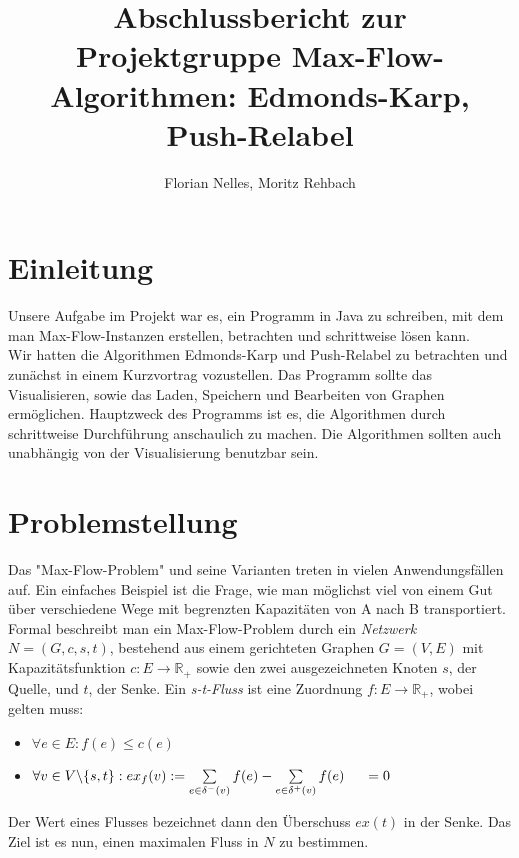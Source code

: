 \documentclass{llncs}
\begin{document}
\title{Abschlussbericht zur Projektgruppe Max-Flow-Algorithmen: Edmonds-Karp, Push-Relabel}

\author{Florian Nelles, Moritz Rehbach}

\maketitle
\vspace{1cm}
\section{Einleitung}
Unsere Aufgabe im Projekt war es, ein Programm in Java zu schreiben, mit dem man Max-Flow-Instanzen erstellen, betrachten und schrittweise lösen kann. \\
Wir hatten die Algorithmen Edmonds-Karp \cite{Roe1} und Push-Relabel \cite{KV} zu betrachten und zunächst in einem Kurzvortrag vozustellen. 
Das Programm sollte das Visualisieren, sowie das Laden, Speichern und Bearbeiten von Graphen ermöglichen. Hauptzweck des Programms ist es, die Algorithmen durch schrittweise Durchführung anschaulich zu machen. Die Algorithmen sollten auch unabhängig von der Visualisierung benutzbar sein.

\section{Problemstellung}\label{sec:Problemstellung}

Das "Max-Flow-Problem" und seine Varianten treten in vielen Anwendungsfällen auf. Ein einfaches Beispiel ist die Frage, wie man möglichst viel von einem Gut über verschiedene Wege mit begrenzten Kapazitäten von A nach B transportiert.\\
Formal beschreibt man ein Max-Flow-Problem durch ein \textit{Netzwerk} $N=(G,c,s,t)$, bestehend aus einem gerichteten Graphen $ G=(V,E) $ mit Kapazitätsfunktion $ c: E \rightarrow  \mathbb{R_+} $ sowie den zwei ausgezeichneten Knoten $s$, der Quelle, und $t$, der Senke. Ein \textit{s-t-Fluss} ist eine Zuordnung $ f: E \rightarrow  \mathbb{R_+} $, wobei gelten muss: 
\begin{itemize}

\item $\forall e \in E: f(e) \leq c(e)$
\item $\forall v \in V \ensuremath{\backslash}\{s,t\} : ex_f(v):= \sum\limits_{e \in \delta^{-}(v)}f(e) - \sum\limits_{e \in \delta^{+}(v)} f(e) \hspace{0.5cm}= 0$
\end{itemize}
Der Wert eines Flusses bezeichnet dann den Überschuss $ex(t)$ in der Senke. Das Ziel ist es nun, einen maximalen Fluss in $N$ zu bestimmen.
\pagebreak
\end{document}
